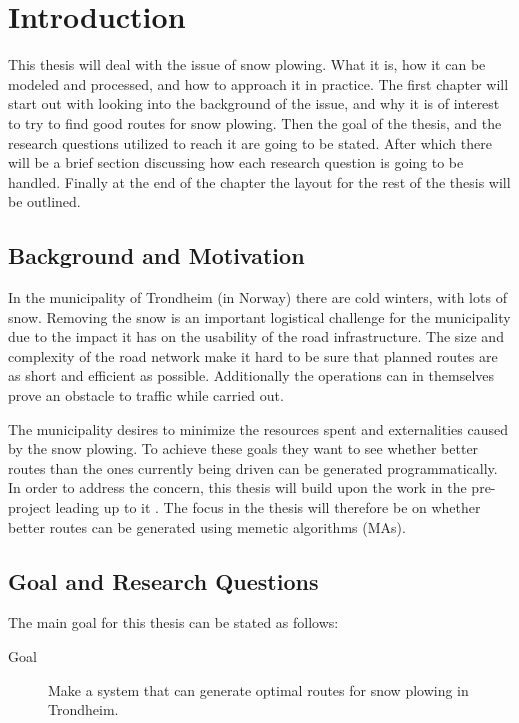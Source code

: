 \chapter{Introduction}
\label{cha:introduction}

This thesis will deal with the issue of snow plowing. What it is, how it can be modeled and processed, and how to approach it in practice. The first chapter will start out with looking into the background of the issue, and why it is of interest to try to find good routes for snow plowing. Then the goal of the thesis, and the research questions utilized to reach it are going to be stated. After which there will be a brief section discussing how each research question is going to be handled. Finally at the end of the chapter the layout for the rest of the thesis will be outlined.

\section{Background and Motivation}

In the municipality of Trondheim (in Norway) there are cold winters, with lots of snow. Removing the snow is an important logistical challenge for the municipality due to the impact it has on the usability of the road infrastructure. The size and complexity of the road network make it hard to be sure that planned routes are as short and efficient as possible. Additionally the operations can in themselves prove an obstacle to traffic while carried out.

The municipality desires to minimize the resources spent and externalities caused by the snow plowing. To achieve these goals they want to see whether better routes than the ones currently being driven can be generated programmatically. In order to address the concern, this thesis will build upon the work in the pre-project leading up to it \citep{forprosjektet}. The focus in the thesis will therefore be on whether better routes can be generated using memetic algorithms (MAs).

\section{Goal and Research Questions}
\label{sec:goal_and_research_questions}

The main goal for this thesis can be stated as follows:

\begin{description}
    \item [Goal] Make a system that can generate optimal routes for snow plowing in Trondheim.
\end{description}

